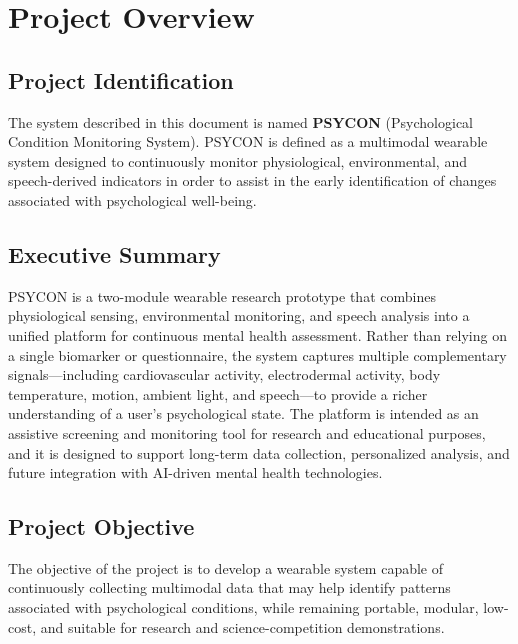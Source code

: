\section{Project Overview}
\label{sec:project-overview}

\subsection{Project Identification}
\label{sec:project-identification}

The system described in this document is named \textbf{PSYCON} (Psychological Condition Monitoring System). PSYCON is defined as a multimodal wearable system designed to continuously monitor physiological, environmental, and speech-derived indicators in order to assist in the early identification of changes associated with psychological well-being.

\subsection{Executive Summary}
\label{sec:executive-summary}

PSYCON is a two-module wearable research prototype that combines physiological sensing, environmental monitoring, and speech analysis into a unified platform for continuous mental health assessment. Rather than relying on a single biomarker or questionnaire, the system captures multiple complementary signals---including cardiovascular activity, electrodermal activity, body temperature, motion, ambient light, and speech---to provide a richer understanding of a user's psychological state. The platform is intended as an assistive screening and monitoring tool for research and educational purposes, and it is designed to support long-term data collection, personalized analysis, and future integration with AI-driven mental health technologies.

\subsection{Project Objective}
\label{sec:project-objective}

The objective of the project is to develop a wearable system capable of continuously collecting multimodal data that may help identify patterns associated with psychological conditions, while remaining portable, modular, low-cost, and suitable for research and science-competition demonstrations.

